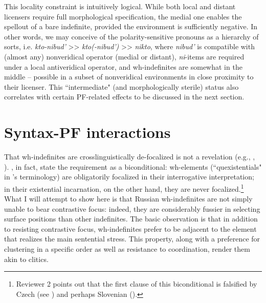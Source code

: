 \documentclass[output=paper,colorlinks,citecolor=brown]{langscibook}
\begin{document}
\noindent This locality constraint is intuitively logical. While both local and distant licensers require full morphological specification, the medial one enables the spellout of a bare indefinite, provided the environment is sufficiently negative. In other words, we may conceive of the polarity-sensitive pronouns as a hierarchy of sorts, i.e. \textit{kto-nibud'} >> \textit{kto(-nibud')} >> \textit{nikto}, where \textit{nibud'} is compatible with (almost any) nonveridical operator (medial or distant), \textit{ni}-items are required under a local antiveridical operator, and wh-indefinites are somewhat in the middle -- possible in a subset of nonveridical environments in close proximity to their licenser. This ``intermediate" (and morphologically sterile) status also correlates with certain PF-related effects to be discussed in the next section. 


\section{Syntax-PF interactions}\label{zan:sec:syntax} 

That wh-indefinites are crosslinguistically de-focalized is not a revelation (e.g., \citealt{haida2008indefiniteness}, \citealt{hengeveld2022quexistentials}). \citet{hengeveld2022quexistentials}, in fact, state the requirement as a biconditional: wh-elements (``quexistentials" in \citeauthor{hengeveld2022quexistentials}'s terminology) are obligatorily focalized in their interrogative interpretation; in their existential incarnation, on the other hand, they are never focalized.\footnote{Reviewer 2 points out that the first clause of this biconditional is falsified by Czech (see \citealt{vsimik2010interpretation}) and perhaps Slovenian (\citealt{mivsmavs2017slovenian}).} What I will attempt to show here is that Russian wh-indefinites are not simply unable to bear contrastive focus: indeed, they are considerably fussier in selecting surface positions than other indefinites. The basic observation is that in addition to resisting contrastive focus, wh-indefinites prefer to be adjacent to the element that realizes the main sentential stress. This property, along with a preference for clustering in a specific order as well as resistance to coordination, render them akin to clitics. 
\end{document}
